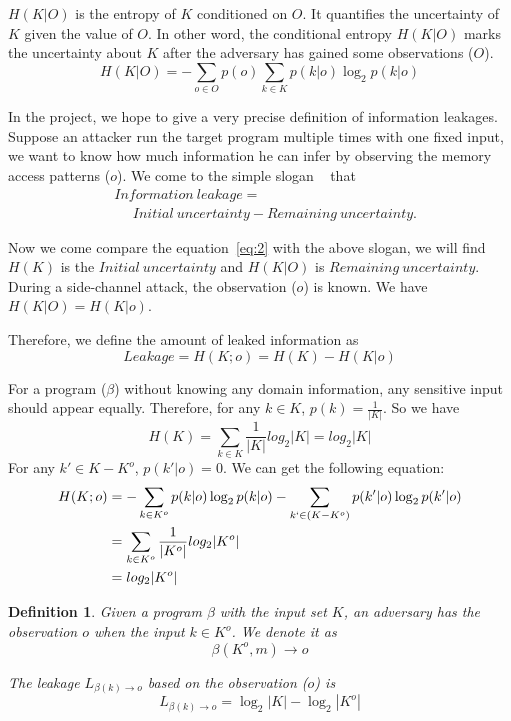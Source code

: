 $H(K|O)$ is the entropy of $K$ conditioned on $O$. It quantifies the uncertainty of $K$
given the value of $O$. In other word, the conditional entropy $H(K|O)$ marks the 
uncertainty about $K$ after the adversary has gained some observations ($O$). 
\begin{equation}
    H(K|O) = - \sum_{o {\in} O} {p(o) \sum_{k {\in} K}{p(k|o)\log_2p(k|o)}}
\end{equation}

In the project, we hope to give a very precise definition of information leakages. 
Suppose an attacker run the target program multiple times with one fixed input, we
want to know how much information he can infer by observing the memory access patterns ($o$).
We come to the simple slogan ~\cite{10.1007/978-3-642-00596-1_21} %
that
\begin{align*}
 & \mathit{Information\ leakage} = \\
 & ~~~~~~ \mathit{Initial\ uncertainty} - \mathit{Remaining\ uncertainty}. 
\end{align*}

Now we come compare the equation~\ref{eq:2} with the above slogan, we will
find $H(K)$ is the $\mathit{Initial\ uncertainty}$ and $H(K|O)$ is
$\mathit{Remaining\ uncertainty}$. During a side-channel attack, 
the observation ($o$) is known.  We have $H(K|O) = H(K|o)$.

Therefore, we define the amount of leaked information as 
\begin{displaymath}
    Leakage = H(K;o) = H(K) - H(K|o)
\end{displaymath}

For a program ($\beta$) without knowing any domain information, any sensitive
input should appear equally. Therefore, for any $k \in K$, $p(k) = \frac{1}{|K|}$.
So we have 
$$H(K) = \sum_{k {\in} K}\frac{1}{|K|}log_2{|K|} = log_2{|K|}$$
For any $k' \in K - K^o$, $p(k'|o) = 0$. We can get the following equation:
\begin{align*}
H(K;o) &= - \sum_{k {\in} K^o}{p(k|o)\log_2p(k|o)} 
          - \sum_{k` {\in} (K - K^o)}{p(k'|o)\log_2p(k'|o)}\\
       &= \sum_{k {\in} K^o}\frac{1}{|K^o|}log_2{|K^o|}\\
       &= log_2{|K^o|}
\end{align*}

\newtheorem{mydef}{Definition}

\begin{mydef}
\label{def}
Given a program $\beta$ with the input set $K$, 
an adversary has the observation $o$ when the input $k{\in}K^o$. 
We denote it as
$$\beta(K^o, m) \rightarrow	o$$

The leakage $L_{\beta(k)\rightarrow o}$ based on the observation ($o$) is
    $$L_{\beta(k)\rightarrow o} = \log_2{|K|} - \log_2{|K^o|}$$
\end{mydef}

